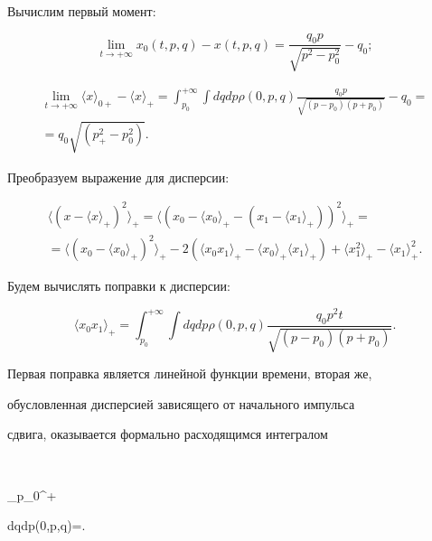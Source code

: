  Вычислим первый момент:

\begin{equation}

\lim_{t\rightarrow+\infty}x_0(t,p,q)-x(t,p,q)=\frac{q_0p}{\sqrt{p^2-p^2_0}}-q_0;

\end{equation}

\begin{multline}

\lim_{t\rightarrow+\infty}\langle x\rangle_{0+}-\langle

x\rangle_{+}=\int_{p_0}^{+\infty}\int

dqdp\rho(0,p,q)\frac{q_0p}{\sqrt{(p-p_0)(p+p_0)}} -q_0

=\\=q_0\sqrt{(p^2_{+}-p^2_0)}.

\end{multline}



Преобразуем выражение для дисперсии:

\begin{multline}

\langle(x-\langle x\rangle_{+})^2\rangle_{+}=\langle(x_0-\langle x_0\rangle_{+} -(x_1- \langle x_1\rangle_{+}))^2\rangle_{+}=

\\

=\langle(x_0-\langle x_0\rangle_{+})^2\rangle_{+} -2(\langle x_0x_1\rangle_{+}-\langle x_0\rangle_{+}\langle x_1\rangle_{+})+\langle x_1^2\rangle_{+}-

\langle x_1\rangle_{+}^2.

\end{multline}

Будем вычислять поправки к дисперсии:

$$

\langle x_0x_1\rangle_{+}=\int_{p_0}^{+\infty}\int

dqdp\rho(0,p,q)\frac{q_0p^2t}{\sqrt{(p-p_0)(p+p_0)}}.

$$

Первая поправка является линейной функции времени, вторая же,

обусловленная дисперсией зависящего от начального импульса

сдвига, оказывается формально расходящимся интегралом

$$

\int_{p_0}^{+\infty}\int

dqdp\rho(0,p,q)=\infty.

